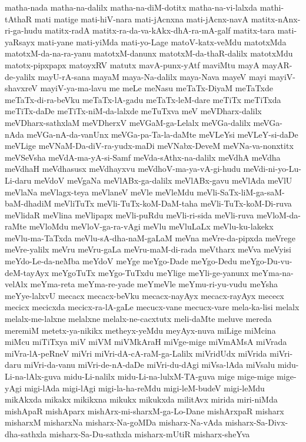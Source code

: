 {matha-nada
matha-na-dalilx
matha-na-diM-dotitx
matha-na-vi-lalxda
mathi-tAthaR
mati
matige
mati-hiV-nara
mati-jAcnxna
mati-jAcnx-navA
matitx-nAnx-ri-ga-hudu
matitx-radA
matitx-ra-da-va-kAkx-dhA-ra-mA-galf
matitx-tara
mati-yaRsayx
mati-yane
mati-yiMda
mati-yo-Lage
matoV-katx-veMdu
matotxMda
matotxM-da-na-ra-yanu
matotxM-danunx
matotxM-da-thaR-dalilx
matotxMdu
matotx-pipxpapx
matoyxRV
matutx
mavA-punx-yAtf
maviMtu
mayA
mayAR-de-yalilx
mayU-rA-sana
mayaM
maya-Na-dalilx
maya-Nava
mayeV
mayi
mayiV-shavxreV
mayiV-ya-ma-lavu
me
meLe
meNasu
meTaTx-DiyaM
meTaTxde
meTaTx-di-ra-beVku
meTaTx-lA-gadu
meTaTx-leM-dare
meTiTx
meTiTxda
meTiTx-daDe
meTiTx-niM-da-lalxde
meTuTxva
meV
meVDharx-dalilx
meVDharx-sathxlaM
meVDherxV
meVGaM-ga-Lelalx
meVGa-dalilx
meVGa-nAda
meVGa-nA-da-vanUnx
meVGa-pa-Ta-la-daMte
meVLeYsi
meVLeY-si-daDe
meVLige
meVNaM-Da-diV-ra-yudx-maDi
meVNabx-DeveM
meVNa-va-nonxtitx
meVSeVsha
meVdA-ma-yA-si-Samf
meVda-sAthx-na-dalilx
meVdhA
meVdha
meVdhaH
meVdhasusx
meVdhayxvu
meVdhoV-ma-ya-vA-gi-hudu
meVdi-ni-yo-Lu-Li-daru
meVdoV
meVgaNa
meVlABx-ga-dalilx
meVlABx-gavu
meVlAda
meVlU
meVlaNa
meVlagx-teya
meVlaneV
meVle
meVleMdu
meVli-SaTx-liM-ga-saM-baM-dhadiM
meVliTuTx
meVli-TuTx-koM-DaM-taha
meVli-TuTx-koM-Di-ruva
meVlidaR
meVlina
meVlipapx
meVli-puRdu
meVli-ri-sida
meVli-ruva
meVloM-da-raMte
meVloMdu
meVloV-ga-ra-vAgi
meVlu
meVluLaLx
meVlu-ku-lakekx
meVlu-ma-TaTxda
meVlu-sA-dha-naM-gaLaM
meVna
meVre-da-pipxda
meVrege
meVre-yalilx
meVru
meVru-gaLa
meVru-maM-di-rada
meVtharx
meVva
meVyisi
meYdo-Le-da-neMba
meYdoV
meYge
meYgo-Dade
meYgo-Dedu
meYgo-Du-vu-deM-tayAyx
meYgoTuTx
meYgo-TuTxdu
meYlige
meYli-ge-yanunx
meYma-na-velAlx
meYma-reta
meYma-re-yade
meYmeVle
meYmu-ri-yu-vudu
meYsha
meYye-lalxvU
mecacx
mecacx-beVku
mecacx-nayAyx
mecacx-rayAyx
mececx
mecicx
mecicxda
mecicx-ra-lA-gaLe
mecucx-vane
mecucx-vare
mela-ka-lisi
melalx
melalx-me-lalxne
melalxne
melalx-ne-cacxtutx
meli-daMte
meluve
mereda
meremiM
metetx-ya-nikikx
metheyx-yeMdu
meyAyx-nuva
miLige
miMcina
miMcu
miTiTxya
miV
miVM
miVMkAraH
miVge-mige
miVmAMsA
miVrada
miVra-lA-peRneV
miVri
miVri-dA-cA-raM-ga-Lalilx
miVridUdx
miVrida
miVri-daru
miVri-da-vanu
miVri-de-nA-daDe
miVri-du-dAgi
miVsa-lAda
miVsalu
midu-Li-na-lAlx-guva
midu-Li-nalilx
midu-Li-na-lulxM-TA-guva
mige
mige-mige
mige-yAgi
migi-lAda
migi-lAgi
migi-la-ha-reMdu
migi-leM-budeV
migi-leMdu
mikAkxda
mikakx
mikikxna
mikukx
mikukxda
militAvx
mirida
miri-niMda
mishApaR
mishAparx
mishArx-mi-sharxM-ga-Lo-Dane
mishArxpaR
misharx
misharxM
misharxNa
misharx-Na-goMDa
misharx-Na-vAda
misharx-Sa-Divx-dha-sathxla
misharx-Sa-Du-sathxla
misharx-mUtiR
misharx-sheYva
}
